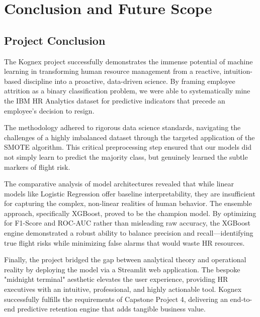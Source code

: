 \chapter{Conclusion and Future Scope}

\section{Project Conclusion}
The Kognex project successfully demonstrates the immense potential of machine learning in transforming human resource management from a reactive, intuition-based discipline into a proactive, data-driven science. By framing employee attrition as a binary classification problem, we were able to systematically mine the IBM HR Analytics dataset for predictive indicators that precede an employee's decision to resign.

The methodology adhered to rigorous data science standards, navigating the challenges of a highly imbalanced dataset through the targeted application of the SMOTE algorithm. This critical preprocessing step ensured that our models did not simply learn to predict the majority class, but genuinely learned the subtle markers of flight risk.

The comparative analysis of model architectures revealed that while linear models like Logistic Regression offer baseline interpretability, they are insufficient for capturing the complex, non-linear realities of human behavior. The ensemble approach, specifically XGBoost, proved to be the champion model. By optimizing for F1-Score and ROC-AUC rather than misleading raw accuracy, the XGBoost engine demonstrated a robust ability to balance precision and recall—identifying true flight risks while minimizing false alarms that would waste HR resources.

Finally, the project bridged the gap between analytical theory and operational reality by deploying the model via a Streamlit web application. The bespoke "midnight terminal" aesthetic elevates the user experience, providing HR executives with an intuitive, professional, and highly actionable tool. Kognex successfully fulfills the requirements of Capstone Project 4, delivering an end-to-end predictive retention engine that adds tangible business value.

